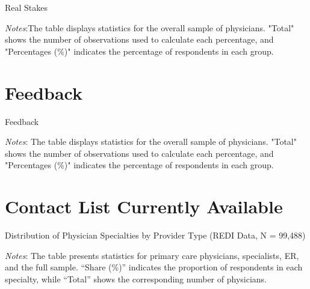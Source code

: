 \documentclass[11pt]{article}
\theoremstyle{definition}
\begin{document}
\begin{table}[H]
    \centering
    \caption{Real Stakes}
        \begin{adjustbox}{width=0.75\linewidth} 

\end{adjustbox}
     \parbox{\linewidth}{
        	\vspace{.2cm}
        		\scriptsize{\scriptsize{{\emph{Notes}:The table displays statistics for the overall sample of physicians. "Total" shows the number of observations used to calculate each percentage, and "Percentages (\%)" indicates the percentage of respondents in each group.}}}}
    \label{tab:stakes_table}
\end{table}

\clearpage

\section{Feedback}

\begin{table}[H]
    \centering
    \caption{Feedback}
        \begin{adjustbox}{width=0.45\linewidth}  

\end{adjustbox}
     \parbox{\linewidth}{
        	\vspace{.2cm}
        		\scriptsize{\scriptsize{{\emph{Notes}: The table displays statistics for the overall sample of physicians. "Total" shows the number of observations used to calculate each percentage, and "Percentages (\%)" indicates the percentage of respondents in each group.}}}}
    \label{tab:ai_table}
\end{table}

\clearpage

\appendix

\section{Contact List Currently Available}

\begin{table}[H]
    \centering
    \caption{Distribution of Physician Specialties by Provider Type (REDI Data, N = 99,488)}
    	\begin{adjustbox}{max width=0.8\textwidth}

\end{adjustbox}
     \parbox{.9\linewidth}{
        	\vspace{.2cm}
        		\scriptsize{\scriptsize{{\emph{Notes}: The table presents statistics for primary care physicians, specialists, ER, and the full sample. “Share (\%)” indicates the proportion of respondents in each specialty, while “Total” shows the corresponding number of physicians.}}}}
    \label{tab:spec_table}
\end{table}
\end{document}
